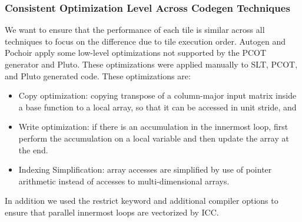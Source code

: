 \subsubsection{Consistent Optimization Level Across Codegen Techniques} 
We want to ensure that the performance of each tile is similar across all
techniques to focus on the difference due to tile execution order.  Autogen
and Pochoir apply some low-level optimizations not supported by the PCOT
generator and Pluto. These optimizations were applied manually to SLT, PCOT,
and Pluto generated code.
%
These optimizations are:
\begin{itemize}
\item Copy optimization: copying transpose of a column-major input matrix
inside a base function to a local array, so that it can be accessed in unit
stride, and 
\item Write optimization: if there is an accumulation in the innermost loop,
first perform the accumulation on a local variable and then update the array
at the end.
\item Indexing Simplification: array accesses are simplified by use of pointer arithmetic
instead of accesses to multi-dimensional arrays.
 \end{itemize}
%
%
In addition we used the restrict keyword and additional compiler options to
ensure that parallel innermost loops are vectorized by ICC.

